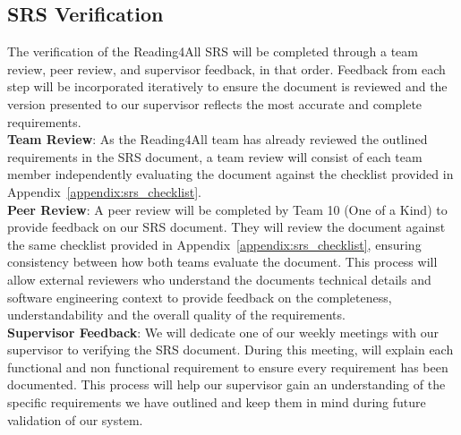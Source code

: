 \documentclass[12pt, titlepage]{article}
\begin{document}
  
\subsection{SRS Verification}
The verification of the Reading4All SRS will be completed
through a team review, peer review, and supervisor feedback, in that order.
Feedback from each step will be incorporated iteratively to ensure
the document is reviewed and the version presented to our supervisor
reflects the most accurate and complete requirements. \\

\textbf{Team Review}:
As the Reading4All team has already reviewed the outlined
requirements in the SRS document, a team review will
consist of each team member independently evaluating the document
against the checklist provided in Appendix~\ref{appendix:srs_checklist}.   \\

\textbf{Peer Review}:
A peer review will be completed by Team 10 (One of a Kind) to provide
feedback on our SRS document.
They will review the document against the same checklist provided in
Appendix~\ref{appendix:srs_checklist}, ensuring consistency between
how both teams evaluate the document.
This process will allow external reviewers who understand the
documents technical details and software engineering context to
provide feedback on the completeness, understandability and the
overall quality of the requirements. \\

\textbf{Supervisor Feedback}:
We will dedicate one of our weekly meetings with our supervisor to
verifying the SRS document.
During this meeting, will explain each functional and non functional
requirement to ensure every requirement has been documented.
This process will help our supervisor gain an understanding of the
specific requirements we have outlined and keep them in
mind during future validation of our system. \\
\end{document}
